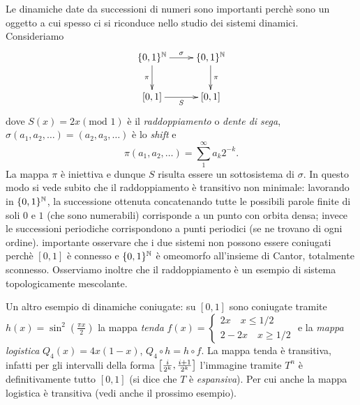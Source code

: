\begin{esempio} Le dinamiche date da successioni di numeri sono importanti perchè sono un oggetto a cui 
spesso ci si riconduce nello studio dei sistemi dinamici. Consideriamo
\[ \xymatrix{ \{0,1\}^\N \ar[r]^\sigma \ar[d]_\pi & \{0,1\}^\N \ar[d]^\pi \\ [0,1] \ar[r]_S & [0,1] } \]
 dove $S(x)=2x(\mbox{mod } 1)$ è il \emph{raddoppiamento} o \emph{dente di sega}, $\sigma(a_1,a_2,\dots)=(a_2,a_3,\dots)$ è lo \emph{shift} e 
 \[\pi(a_1,a_2,\dots)=\sum_1^\infty a_k 2^{-k}.\]
 La mappa $\pi$ è iniettiva e dunque $S$ risulta essere un sottosistema di $\sigma$. In questo modo si vede subito che il raddoppiamento è transitivo non minimale: 
 lavorando in $\{0,1\}^{\mathbb{N}}$, la successione ottenuta concatenando tutte le possibili parole finite di soli $0$ e $1$ (che sono numerabili) corrisponde a un punto con orbita densa; 
 invece le successioni periodiche corrispondono a punti periodici (se ne trovano di ogni ordine). 
 \Eacc importante osservare che i due sistemi non possono essere coniugati perchè $[0,1]$ è connesso e $\{0,1\}^{\mathbb{N}}$ è omeomorfo all'insieme di Cantor, 
 totalmente sconnesso. \newline
 Osserviamo inoltre che il raddoppiamento è un esempio di sistema topologicamente mescolante.
\end{esempio}



\begin{esempio} Un altro esempio di dinamiche coniugate: 
su $[0,1]$ sono coniugate tramite $h(x)=\sin^2\left(\frac{\pi x}{2}\right)$ la mappa \emph{tenda} 
$f(x)=\begin{cases}2x \quad x\leq 1/2 \\ 2-2x \quad x\geq 1/2\end{cases}$ e la \emph{mappa logistica} $Q_4(x)=4x(1-x)$, $Q_4\circ h=h\circ f$.
La mappa tenda è transitiva, infatti per gli intervalli della forma $\left[\frac{i}{2^k},\frac{i+1}{2^k}\right]$ l'immagine
tramite $T^n$ è definitivamente tutto $[0,1]$ (si dice che $T$ è \emph{espansiva}). Per cui anche la mappa logistica è transitiva (vedi anche il prossimo esempio).
\end{esempio}



